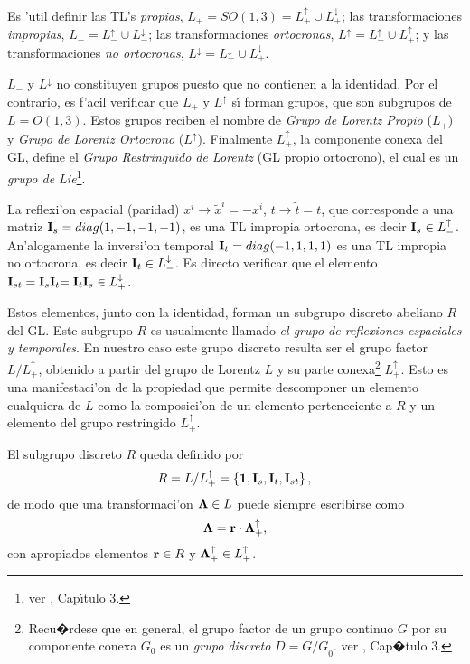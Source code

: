 Es 'util definir las TL's {\em propias}, $L_{+}=SO(1,3)=L_{+}^{\uparrow
}\cup L_{+}^{\downarrow }$; las transformaciones {\em impropias}, $%
L_{-}=L_{-}^{\uparrow }\cup L_{-}^{\downarrow }$; las transformaciones {\em %
ortocronas}, $L^{\uparrow }=L_{-}^{\uparrow }\cup L_{+}^{\uparrow }$; y las
transformaciones {\em no ortocronas}, $L^{\downarrow }=L_{-}^{\downarrow
}\cup L_{+}^{\downarrow }.$

$L_{-}$ y $L^{\downarrow }$ no constituyen grupos puesto que no contienen a
la identidad. Por el contrario, es f'acil verificar que $L_{+}$ y $%
L^{\uparrow }$ s{\'{\i }} forman grupos, que son subgrupos de $L=O(1,3)$.
Estos grupos reciben el nombre de {\em Grupo de Lorentz Propio} ($L_{+}$) y
{\em Grupo de Lorentz Ortocrono} ($L^{\uparrow }$). Finalmente $%
L_{+}^{\uparrow }$, la componente conexa del GL, define el {\em Grupo
Restringuido de Lorentz} (GL propio ortocrono), el cual es un {\em grupo de
Lie}\footnote{%
ver \cite{Gilmore}, Cap{\'\i}tulo 3.}.

La reflexi'on espacial (paridad) $x^{i}\rightarrow \widetilde{x}%
^{i}=-x^{i}$, $t\rightarrow \widetilde{t}=t$, que corresponde a una matriz $%
{\bf I}_{s}=diag(1,-1,-1,-1)$, es una TL impropia ortocrona, es decir ${\bf I}%
_{s}\in L_{-}^{\uparrow }$. An'alogamente la inversi'on temporal ${\bf %
I}_{t}=diag(-1,1,1,1)$ es una TL impropia no ortocrona, es decir ${\bf I}_{t}\in
L_{-}^{\downarrow }$. Es directo verificar que el elemento ${\bf I}_{st}=%
{\bf I}_{s}{\bf I}_{t}{\bf =I}_{t}{\bf I}_{s}\in L_{+}^{\downarrow }$.

Estos elementos, junto con la identidad, forman un subgrupo discreto
abeliano $R$ del GL. Este subgrupo $R$ es usualmente llamado {\em el grupo
de reflexiones espaciales y temporales}. En nuestro caso este grupo discreto
resulta ser el grupo factor $L/L_{+}^{\uparrow }$, obtenido a partir del
grupo de Lorentz $L$ y su parte conexa\footnote{Recu�rdese que en general,
el grupo factor de un grupo continuo $G$ por
su componente conexa $G_{0}$ es un {\em grupo discreto }${\mathit D=G/G}_{0}$.
ver \cite{Gilmore}, Cap�tulo 3.} $L_{+}^{\uparrow }$. Esto es una
manifestaci'on de la propiedad que permite descomponer un elemento
cualquiera de $L$ como la composici'on de un elemento perteneciente a $R$
y un elemento del grupo restringido $L_{+}^{\uparrow }$.

El subgrupo discreto $R$ queda definido por 
\begin{equation}
R=L/L_{+}^{\uparrow }=\left\{ {\bf 1},{\bf I}_{s},{\bf I}_{t},{\bf I}%
_{st}\right\} , 
\end{equation}
de modo que una transformaci'on ${\bf \Lambda }\in L$ puede siempre
escribirse como 
\begin{equation}
{\bf \Lambda }={\bf r}\cdot {\bf \Lambda }_{+}^{\uparrow }, 
\end{equation}
con apropiados elementos ${\bf r}\in R$ y ${\bf \Lambda }_{+}^{\uparrow }\in
L_{+}^{\uparrow }$.

